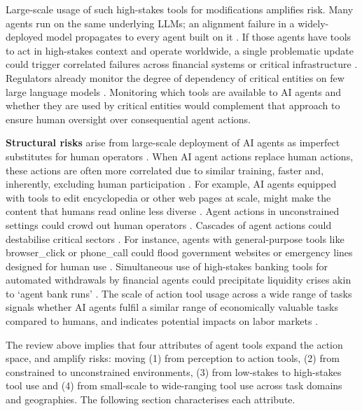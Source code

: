 \documentclass[manuscript,screen,nonacm,oneside]{acmart}
\begin{document}
Large-scale usage of such high-stakes tools for modifications amplifies risk. Many agents run on the same underlying LLMs; an alignment failure in a widely-deployed model propagates to every agent built on it \citep{vipra2023market}. If those agents have tools to act in high-stakes context and operate worldwide, a single problematic update could trigger correlated failures across financial systems or critical infrastructure \citep{tomasev2025virtual}. Regulators already monitor the degree of dependency of critical entities on few large language models \citep{bankofenglandBankEnglands}. Monitoring which tools are available to AI agents and whether they are used by critical entities would complement that approach to ensure human oversight over consequential agent actions. 

\textbf{Structural risks} arise from large-scale deployment of AI agents as imperfect substitutes for human operators \citep{kulveit2025gradual}. When AI agent actions replace human actions, these actions are often more correlated due to similar training, faster and, inherently, excluding human participation \citep{laurito2025aiai}. For example, AI agents equipped with tools to edit encyclopedia or other web pages at scale, might make the content that humans read online less diverse  \citep{battista2024political, qiu2025lockin}.
Agent actions in unconstrained settings could crowd out human operators \citep{ibrahim2025measuring}. Cascades of agent actions could destabilise critical sectors \citep{ibrahim2025measuring,deng2025ai}. For instance, agents with general-purpose tools like browser\_click or phone\_call could flood government websites or emergency lines designed for human use \citep{kulveit2025gradual}.
Simultaneous use of high-stakes banking tools for automated withdrawals by financial agents could precipitate liquidity crises akin to `agent bank runs' \citep{ALDASORO2025101472,danielsson2025artificialintelligencefinancialcrises}. The scale of action tool usage across a wide range of tasks signals whether AI agents fulfil a similar range of economically valuable tasks compared to humans, and indicates potential impacts on labor markets \citep{motwani2024secret, chan2023harms, shao2025future}.

The review above implies that four attributes of agent tools expand the action space, and amplify risks: moving (1) from perception to action tools, (2) from constrained to unconstrained environments, (3) from low-stakes to high-stakes tool use and (4) from small-scale to wide-ranging tool use across task domains and geographies. The following section characterises each attribute. 
\end{document}
